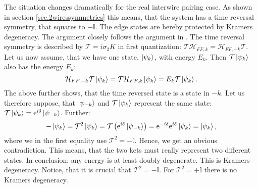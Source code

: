 The situation changes dramatically for the real interwire pairing case. As shown in section \ref{sec.2wiressymmetries} this means, that the system has a time reversal symmetry, that squares to $-\mathbb{I}$. The edge states are hereby protected by Kramers degeneracy. The argument closely follows the argument in \cite{Sakurai}. The time reversal symmetry is described by $\mathcal{T} = i\sigma_2 K$ in first quantization: $\mathcal{T}\mathcal{H}_{FF,k} = \mathcal{H}_{FF,-k}\mathcal{T}$. Let us now assume, that we have one state, $\ket{\psi_k}$, with energy $E_k$. Then $\mathcal{T}\ket{\psi_k}$ also has the energy $E_k$:
\begin{equation}
\mathcal{H}_{FF,-k}\mathcal{T}\ket{\psi_k} = \mathcal{T}\mathcal{H}_{FF,k}\ket{\psi_k} = E_k\mathcal{T}\ket{\psi_k}. \nonumber
\end{equation}
The above further shows, that the time reversed state is a state in $-k$. Let us therefore suppose, that $\ket{\psi_{-k}}$ and $\mathcal{T}\ket{\psi_k}$ represent the same state: $\mathcal{T}\ket{\psi_k} = \text{e}^{i\delta}\ket{\psi_{-k}}$. Further:
\begin{equation}
-\ket{\psi_k} = \mathcal{T}^2\ket{\psi_k} = \mathcal{T}\left(\text{e}^{i\delta}\ket{\psi_{-k}}\right) = \text{e}^{-i\delta}\text{e}^{i\delta}\ket{\psi_k} = \ket{\psi_k}, \nonumber
\end{equation}
where we in the first equality use $\mathcal{T}^2 = -\mathbb{I}$. Hence, we get an obvious contradiction. This means, that the two kets must really represent two different states. In conclusion: any energy is at least doubly degenerate. This is Kramers degeneracy. Notice, that it is crucial that $\mathcal{T}^2 = -\mathbb{I}$. For $\mathcal{T}^2 = +\mathbb{I}$ there is no Kramers degeneracy. 

